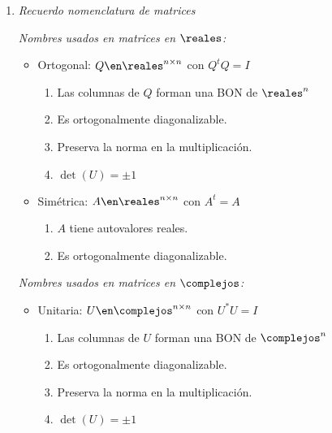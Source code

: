 \begin{enumerate}[label=\tiny\purple{\faIcon{snowman}}]
  \item \textit{Recuerdo nomenclatura de matrices}

        \begin{minipage}{0.5\textwidth}
          \textit{Nombres usados en matrices en $\reales$:}
          \begin{itemize}
            \item Ortogonal: $Q \en \reales^{n \times n}$  con $Q^tQ = I$
                  \begin{enumerate}[label={\tiny\faIcon{atom}}]
                    \item Las columnas de $Q$ forman una BON de $\reales^n$
                    \item Es ortogonalmente diagonalizable.
                    \item Preserva la norma en la multiplicación.
                    \item $\det(U) = \pm1$
                  \end{enumerate}

            \item Simétrica: $A \en \reales^{n \times n}$  con $A^t = A$
                  \begin{enumerate}[label={\tiny\faIcon{atom}}]
                    \item $A$ tiene autovalores reales.
                    \item Es ortogonalmente diagonalizable.
                  \end{enumerate}

          \end{itemize}
        \end{minipage}
        \begin{minipage}{0.5\textwidth}
          \textit{Nombres usados en matrices en $\complejos$:}
          \begin{itemize}
            \item Unitaria: $U \en \complejos^{n \times n}$  con $U^*U = I$
                  \begin{enumerate}[label={\tiny\faIcon{atom}}]
                    \item Las columnas de $U$ forman una BON de $\complejos^n$
                    \item Es ortogonalmente diagonalizable.
                    \item Preserva la norma en la multiplicación.
                    \item $\det(U) = \pm1$
                  \end{enumerate}


\end{itemize}
\end{minipage}
\end{enumerate}
